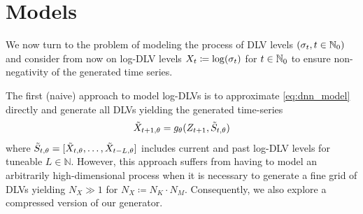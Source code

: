\documentclass[]{article} %
\begin{document}
\section{Models}
\label{sec:generative_models}
We now turn to the problem of modeling the process of DLV levels $(\sigma_{t}, t \in \mathbb{N}_0)$ and consider from now on log-DLV levels $X_t \coloneqq \log(\sigma_t) $ for $t \in \mathbb{N}_0$ to ensure non-negativity of the generated time series. 

The first (naive) approach to model log-DLVs is to approximate \eqref{eq:dnn_model} directly and generate all DLVs yielding the generated time-series 
\begin{equation}
\label{eq:explicit_model}
\tilde {X}_{t+1, \theta} = g_\theta(Z_{t+1}, \tilde S_{t, \theta})
\end{equation}
where $\tilde S_{t, \theta} = [\tilde {X}_{t, \theta}, \dots, \tilde {X}_{t-L, \theta}]$ includes current and past log-DLV levels for tuneable $L \in \mathbb{N}$. However, this approach suffers from having to model an arbitrarily high-dimensional process when it is necessary to generate a fine grid of DLVs yielding $N_X \gg 1$ for $N_X\coloneqq N_K \cdot N_M$. Consequently, we also explore a compressed version of our generator. 
\end{document}
